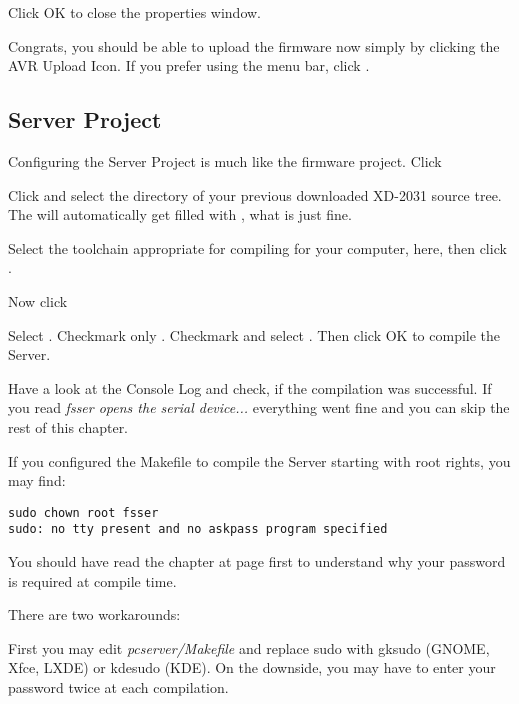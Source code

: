 Click OK to close the properties window.

Congrats, you should be able to upload the firmware now simply by clicking
the AVR Upload Icon. If you prefer using the menu bar, click
.

\subsection{Server Project}
Configuring the Server Project is much like the firmware project. 
Click 

Click  and select the directory  of your previous 
downloaded \mbox{XD-2031} source tree. The  will automatically get filled 
with , what is just fine.

Select the toolchain appropriate for compiling for your computer,  here, 
then click .


\clearpage
Now click  

Select 
. Checkmark only .
Checkmark  and select
. Then click OK to 
compile the Server.


Have a look at the Console Log and check, if the compilation was
successful. If you read \textit{fsser opens the serial device...}
everything went fine and you can skip the rest of this chapter.

If you configured the Makefile to compile the Server starting
with root rights, you may find:

\begin{verbatim}
sudo chown root fsser
sudo: no tty present and no askpass program specified
\end{verbatim}

You should have read the chapter  at page \pageref{rights}
first to understand why your password is required at compile time.

\clearpage
There are two workarounds:

First you may edit \textit{pcserver/Makefile} and replace sudo with 
gksudo (GNOME, Xfce, LXDE) or
kdesudo (KDE). On the downside, you may have to enter your
password twice at each compilation.

